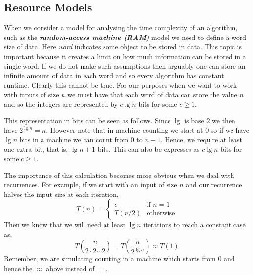 \subsection*{Resource Models}

When we consider a model for analysing the time complexity of an algorithm, such as the \textbf{\textit{random-access machine (RAM)}} model we need to define a word size of data. Here \textit{word} indicates some object to be stored in data. This topic is important because it creates a limit on how much information can be stored in a single word. If we do not make such assumptions then arguably one can store an infinite amount of data in each word and so every algorithm has constant runtime. Clearly this cannot be true. For our purposes when we want to work with inputs of size $n$ we must have that each word of data can store the value $n$ and so the integers are represented by $c\lg n$ bits for some $c\geq 1$.

This representation in bits can be seen as follows. Since $\lg$ is base $2$ we then have $2^{\lg n}=n$. However note that in machine counting we start at $0$ so if we have $\lg n$ bits in a machine we can count from $0$ to $n-1$. Hence, we require at least one extra bit, that is, $\lg n + 1$ bits. This can also be expresses as $c\lg n$ bits for some $c\geq 1$.

The importance of this calculation becomes more obvious when we deal with recurrences. For example, if we start with an input of size $n$ and our recurrence halves the input size at each iteration,
\begin{equation*}
	T(n) =
	\begin{cases}
		c& \text{if }n=1\\
		T(n/2)& \text{otherwise}
	\end{cases}
\end{equation*}
Then we know that we will need at least $\lg n$ iterations to reach a constant case as,
\begin{equation*}
	T\left(\frac{n}{2\cdot2\cdots2}\right) = T\left(\frac{n}{2^{\lg n}}\right)\approx T(1)
\end{equation*}
Remember, we are simulating counting in a machine which starts from $0$ and hence the $\approx$ above instead of $=$.
